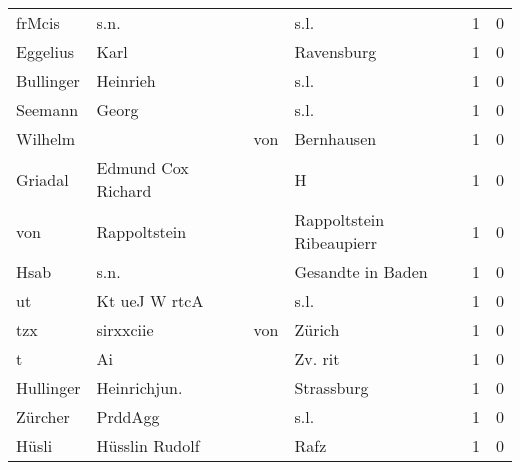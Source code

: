 \begin{center}
\begin{tiny}
\begin{longtabu}{llllrr}
                   frMcis &                               s.n. &             &                                        s.l. &          1 &         0 \\
                 Eggelius &                               Karl &             &                                  Ravensburg &          1 &         0 \\
                Bullinger &                           Heinrieh &             &                                        s.l. &          1 &         0 \\
                  Seemann &                              Georg &             &                                        s.l. &          1 &         0 \\
                  Wilhelm &                                    &         von &                                  Bernhausen &          1 &         0 \\
                  Griadal &                 Edmund Cox Richard &             &                                           H &          1 &         0 \\
                      von &                       Rappoltstein &             &                    Rappoltstein Ribeaupierr &          1 &         0 \\
                     Hsab &                               s.n. &             &                           Gesandte in Baden &          1 &         0 \\
                       ut &                      Kt ueJ W rtcA &             &                                        s.l. &          1 &         0 \\
                      tzx &                          sirxxciie &         von &                                      Zürich &          1 &         0 \\
                        t &                                 Ai &             &                                     Zv. rit &          1 &         0 \\
                Hullinger &                       Heinrichjun. &             &                                  Strassburg &          1 &         0 \\
                  Zürcher &                            PrddAgg &             &                                        s.l. &          1 &         0 \\
                    Hüsli &                     Hüsslin Rudolf &             &                                        Rafz &          1 &         0 \\

\end{longtabu}
\end{tiny}
\end{center}
